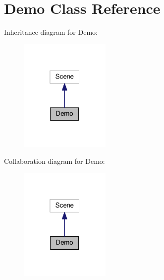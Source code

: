 \hypertarget{classDemo}{}\section{Demo Class Reference}
\label{classDemo}


Inheritance diagram for Demo\+:
\nopagebreak
\begin{figure}[H]
\begin{center}
\leavevmode
\includegraphics[width=124pt]{classDemo__inherit__graph}
\end{center}
\end{figure}


Collaboration diagram for Demo\+:
\nopagebreak
\begin{figure}[H]
\begin{center}
\leavevmode
\includegraphics[width=124pt]{classDemo__coll__graph}
\end{center}
\end{figure}
